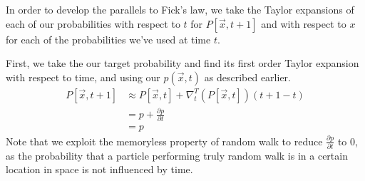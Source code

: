 In order to develop the parallels to Fick's law, we take the Taylor expansions of each of our probabilities with respect to $t$ for $P\left[\vec{x}, t+1\right]$ and with respect to $x$ for each of the probabilities we've used at time $t$.

First, we take the our target probability and find its first order Taylor expansion with respect to time, and using our $p(\vec{x},t)$ as described earlier.
\begin{align*}
    P\left[\vec{x}, t+1\right] &\approx P\left[\vec{x}, t\right] + \nabla^T_t\left(P\left[\vec{x}, t\right]\right) (t+1-t) \\
    &= p + \frac{\partial p}{\partial t} \\
    &= p
\end{align*}
Note that we exploit the memoryless property of random walk to reduce $\frac{\partial p}{\partial t}$ to 0, as the probability that a particle performing truly random walk is in a certain location in space is not influenced by time.

